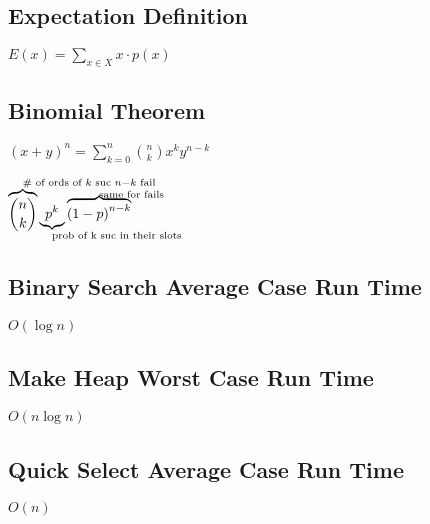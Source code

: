 \subsection*{Expectation Definition}
$E(x)=\sum_{x\in X}x\cdot p(x)$
\subsection*{Binomial Theorem}
${\left(x+y\right)}^n=\sum_{k=0}^n\binom{n}{k}x^{k}y^{n-k}$

$\overbrace{\binom{n}{k}}^{\mathrlap{\textrm{\# of ords of }k\textrm{ suc }n-k\textrm{ fail}}}%
\underbrace{p^k}_{\mathrlap{\textrm{prob of k suc in their slots}}}%
\overbrace{{\left(1-p\right)}^{n-k}}^{\mathrlap{\textrm{\raisebox{-.3\normalbaselineskip}[0pt][0pt]{same for fails}}}}$
\subsection*{Binary Search Average Case Run Time}
$O(\log n)$ %
\subsection*{Make Heap Worst Case Run Time}
$O(n\log n)$
\subsection*{Quick Select Average Case Run Time}
$O(n)$

